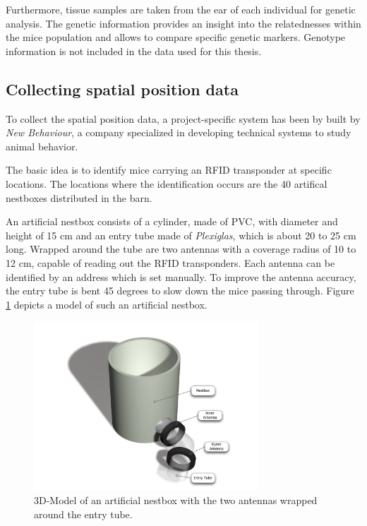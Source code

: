Furthermore, tissue samples are taken from the ear of each individual for genetic analysis. The genetic information provides an insight into the relatednesses within the mice population and allows to compare specific genetic markers. Genotype information is not included in the data used for this thesis.

\subsection{Collecting spatial position data}
\label{subsec:collectspatialpos}

To collect the spatial position data, a project-specific system has been by built by \textit{New Behaviour}, a company specialized in developing technical systems to study animal behavior. 

The basic idea is to identify mice carrying an RFID transponder at specific locations. The locations where the identification occurs are the 40 artifical nestboxes distributed in the barn. 

An artificial nestbox consists of a cylinder, made of \ac{PVC}, with diameter and height of 15 cm and an entry tube made of \textit{Plexiglas}, which is about 20 to 25 cm long. Wrapped around the tube are two antennas with a coverage radius of 10 to 12 cm, capable of reading out the RFID transponders. Each antenna can be identified by an address which is set manually. To improve the antenna accuracy, the entry tube is bent 45 degrees to slow down the mice passing through. Figure \ref{fig:artNestbox} depicts a model of such an artificial nestbox.

\begin{figure}[htbp]	
\centering	
\includegraphics[width=0.75\textwidth]{assets/pdf/box_schema.pdf}	
\caption[Model of an artificial nestbox]{3D-Model of an artificial nestbox with the two antennas wrapped around the entry tube.}
\label{fig:artNestbox}
\end{figure}

